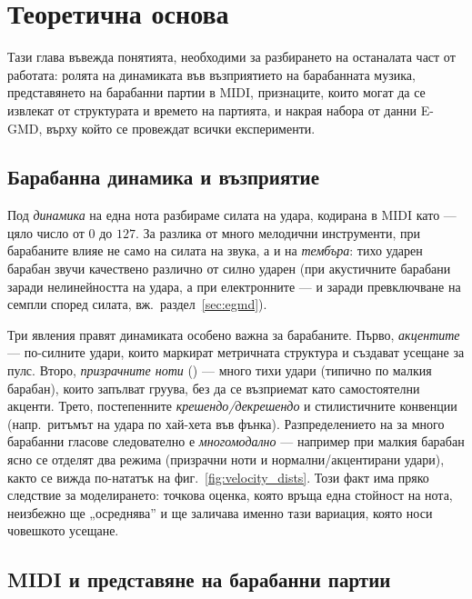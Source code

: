\chapter{Теоретична основа}
\label{ch:osnova}

Тази глава въвежда понятията, необходими за разбирането на останалата част от
работата: ролята на динамиката във възприятието на барабанната музика,
представянето на барабанни партии в MIDI, признаците, които могат да се извлекат
от структурата и времето на партията, и накрая набора от данни E-GMD, върху
който се провеждат всички експерименти.

\section{Барабанна динамика и възприятие}
\label{sec:dinamika}

Под \emph{динамика} на една нота разбираме силата на удара, кодирана в MIDI като
 — цяло число от $0$ до $127$. За разлика от много мелодични
инструменти, при барабаните  влияе не само на силата на звука, а и
на \emph{тембъра}: тихо ударен барабан звучи качествено различно от силно ударен
(при акустичните барабани заради нелинейността на удара, а при електронните — и
заради превключване на семпли според силата, вж.\ раздел~\ref{sec:egmd}).

Три явления правят динамиката особено важна за барабаните. Първо, \emph{акцентите}
— по-силните удари, които маркират метричната структура и създават усещане за
пулс. Второ, \emph{призрачните ноти} () — много тихи удари
(типично по малкия барабан), които запълват груува, без да се възприемат като
самостоятелни акценти. Трето, постепенните \emph{крешендо/декрешендо} и
стилистичните конвенции (напр.\ ритъмът на удара по хай-хета във фънка).
Разпределението на  за много барабанни гласове следователно е
\emph{многомодално} — например при малкия барабан ясно се отделят два режима
(призрачни ноти и нормални/акцентирани удари), както се вижда по-нататък на
фиг.~\ref{fig:velocity_dists}. Този факт има пряко следствие за моделирането:
точкова оценка, която връща една стойност на нота, неизбежно ще „осреднява'' и
ще заличава именно тази вариация, която носи човешкото усещане.

\section{MIDI и представяне на барабанни партии}
\label{sec:midi}

